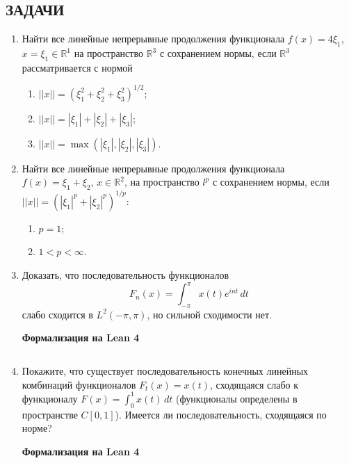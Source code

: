 \documentclass[12pt,a4paper]{article}
\begin{document}
\subsection*{ЗАДАЧИ}
\begin{enumerate}
\item Найти все линейные непрерывные продолжения функционала $f(x) = 4\xi_{1}$, $x = \xi_{1} \in \mathbb{R}^{1}$ на пространство $\mathbb{R}^{3}$ с сохранением нормы, если $\mathbb{R}^{3}$ рассматривается с нормой
\begin{enumerate}[label=\alph*)]
\item $||x|| = (\xi_{1}^{2} + \xi_{2}^{2} + \xi_{3}^{2})^{1/2}$;
\item $||x|| = |\xi_{1}| + |\xi_{2}| + |\xi_{3}|$;
\item $||x|| = \max(|\xi_{1}|, |\xi_{2}|, |\xi_{3}|)$.
\end{enumerate}

\item Найти все линейные непрерывные продолжения функционала $f(x) = \xi_{1} + \xi_{2}$, $x \in \mathbb{R}^{2}$, на пространство $l^{p}$ с сохранением нормы, если $||x|| = (|\xi_{1}|^{p} + |\xi_{2}|^{p})^{1/p}$:
\begin{enumerate}[label=\alph*)]
\item $p=1$;
\item $1 < p < \infty$.
\end{enumerate}

\newpage
\item Доказать, что последовательность функционалов
$$F_{n}(x) = \int_{-\pi}^{\pi} x(t) e^{int} \, dt$$
слабо сходится в $L^{2}(-\pi,\pi)$, но сильной сходимости нет.


\begin{center}\small\textbf{Формализация на Lean 4}\end{center}
\inputminted{lean}{FunAn/Section17_HahnBanach/Task03.lean}

\newpage
\item Покажите, что существует последовательность конечных линейных комбинаций функционалов $F_{t}(x) = x(t)$, сходящаяся слабо к функционалу $F(x) = \int_{0}^{1} x(t) \, dt$ (функционалы определены в пространстве $C[0,1]$). Имеется ли последовательность, сходящаяся по норме?


\begin{center}\small\textbf{Формализация на Lean 4}\end{center}
\inputminted{lean}{FunAn/Section17_HahnBanach/Task04.lean}


\end{enumerate}
\end{document}
